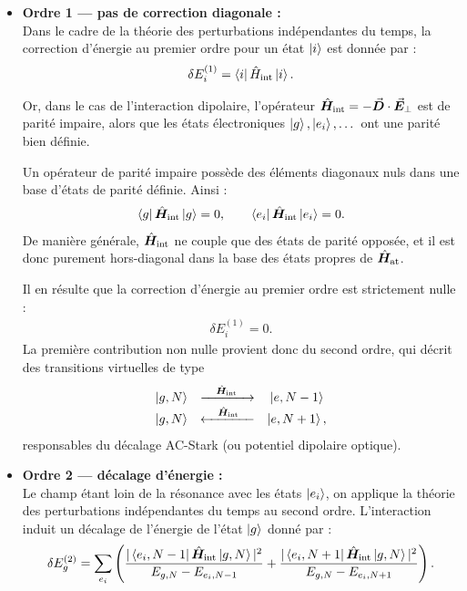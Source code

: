 \begin{itemize}[label = $\bullet$] 
	\item \textbf{Ordre 1 — pas de correction diagonale :}\\ 
	Dans le cadre de la théorie des perturbations indépendantes du temps, 
	la correction d’énergie au premier ordre pour un état \( \ket{i} \) est donnée par :
	\begin{eqnarray}
		\delta E_i^{(1)} = \bra{i} \hat{H}_{\mathrm{int}} \ket{i}.
	\end{eqnarray}

	Or, dans le cas de l’interaction dipolaire, l’opérateur 
	\( \hat{\bm{H}}_{\text{int}} = - \vec{{\bm{D}}} \cdot \vec{{\bm{E}}}_\perp \) 
	est de parité impaire, alors que les états électroniques 
	\( \ket{g}, \ket{e_i}, \dots \) ont une parité bien définie.  

	\medskip

	Un opérateur de parité impaire possède des éléments diagonaux nuls dans une base d’états 
	de parité définie. Ainsi :
	\begin{eqnarray}
		\bra{g} \hat{\bm{H}}_{\text{int}}  \ket{g} = 0, 
		\qquad 
		\bra{e_i} \hat{\bm{H}}_{\text{int}}  \ket{e_i} = 0.
	\end{eqnarray}
	De manière générale, \( \hat{\bm{H}}_{\text{int}} \) ne couple que des états de parité opposée, 
	et il est donc purement hors-diagonal dans la base des états propres de \( \hat{\bm{H}}_{\mathrm{at}} \).  

	\medskip
	Il en résulte que la correction d’énergie au premier ordre est strictement nulle :
	\begin{eqnarray}
		\delta E_i^{(1)} = 0.
	\end{eqnarray}
	La première contribution non nulle provient donc du second ordre, 
	qui décrit des transitions virtuelles de type 
	\begin{eqnarray}
	\begin{array}{ccc}
		\ket{g,N} & \xrightarrow{\quad \hat{\bm{H}}_{\text{int}} \quad}& \ket{e,N-1} \\ 
		\ket{g, N } &  \xleftarrow{\quad \hat{\bm{H}}_{\text{int}} \quad} & \ket{e,N+1}    ,		
	\end{array}		
	\end{eqnarray}
	responsables du décalage AC-Stark (ou potentiel dipolaire optique).\\

	\item \textbf{Ordre 2 — décalage d’énergie :}\\	
	Le champ étant loin de la résonance avec les états \( \ket{e_i} \), 
	on applique la théorie des perturbations indépendantes du temps au second ordre. 
	L’interaction induit un décalage de l’énergie de l’état \( \ket{g} \) donné par :
	\begin{eqnarray}
		\delta E_g^{(2)} 
		= \sum_{e_i} \left (  
		\frac{|\bra{e_i, N-1} \hat{\bm{H}}_{\mathrm{int}} \ket{g, N}|^2}{E_{g,N} - E_{e_i, N-1}} 
		+ \frac{|\bra{e_i, N+1} \hat{\bm{H}}_{\mathrm{int}} \ket{g, N}|^2}{E_{g,N} - E_{e_i, N+1}}
		\right).
	\end{eqnarray}

\end{itemize}

